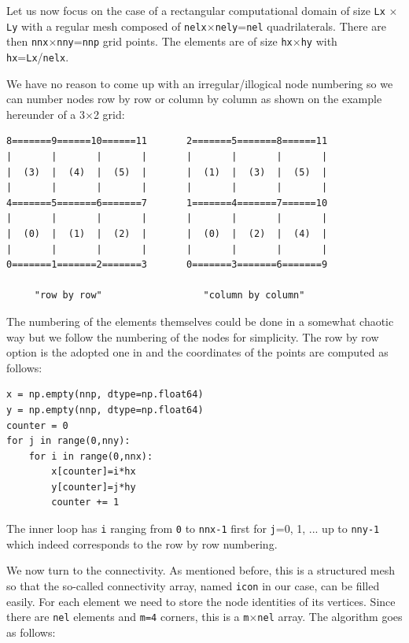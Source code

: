 Let us now focus on the case of a rectangular computational domain of size 
{\tt Lx} $\times$ {\tt Ly} with a regular mesh composed of {\tt nelx}$\times${\tt nely}={\tt nel}
   quadrilaterals.  
There are then {\tt nnx}$\times${\tt nny}={\tt nnp} grid points.
The elements are of size {\tt hx}$\times${\tt hy} with {\tt hx}={\tt Lx}/{\tt nelx}.

We have no reason to come up with an irregular/illogical node numbering so 
we can number nodes row by row or column by column as shown on the example 
hereunder of a 3$\times$2 grid:

\begin{verbatim}
8=======9======10======11       2=======5=======8======11
|       |       |       |       |       |       |       |
|  (3)  |  (4)  |  (5)  |       |  (1)  |  (3)  |  (5)  |
|       |       |       |       |       |       |       |
4=======5=======6=======7       1=======4=======7======10
|       |       |       |       |       |       |       |
|  (0)  |  (1)  |  (2)  |       |  (0)  |  (2)  |  (4)  |
|       |       |       |       |       |       |       |
0=======1=======2=======3       0=======3=======6=======9

     "row by row"                  "column by column"
\end{verbatim}

The numbering of the elements themselves could be done in a somewhat chaotic 
way but we follow the numbering of the nodes for simplicity.
The row by row option is the adopted one in \fieldstone{} and the coordinates of the 
points are computed as follows:

\begin{lstlisting}
x = np.empty(nnp, dtype=np.float64)
y = np.empty(nnp, dtype=np.float64)
counter = 0
for j in range(0,nny):
    for i in range(0,nnx):
        x[counter]=i*hx
        y[counter]=j*hy
        counter += 1
\end{lstlisting}
The inner loop has {\tt i} ranging from {\tt 0} to {\tt nnx-1} first for {\tt j}=0, 1, ...
up to {\tt nny-1} which indeed corresponds to the row by row numbering.

We now turn to the connectivity. As mentioned before, this is a structured mesh so that the so-called
connectivity array, named {\tt icon} in our case, can be filled easily. For each element we need
to store the node identities of its vertices. Since there are {\tt nel} elements and {\tt m=4} corners, 
this is a {\tt m}$\times${\tt nel} array. The algorithm goes as follows:

